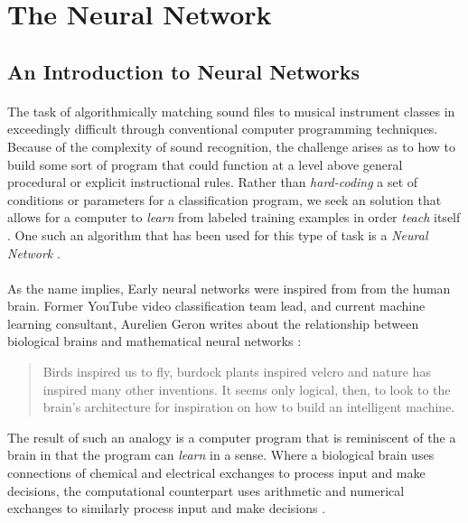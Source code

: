 \documentclass[12pt,letterpaper]{article}
\begin{document}

\newpage
\section{The Neural Network}
\label{sec-TheNeuralNetwork}


\subsection{An Introduction to Neural Networks}
\label{subsec-NerualNetworkIntro}

\paragraph*{}The task of algorithmically matching sound files to musical instrument classes in exceedingly difficult through conventional computer programming techniques. Because of the complexity of sound recognition, the challenge arises as to how to build some sort of program that could function at a level above general procedural or explicit instructional rules. Rather than \textit{hard-coding} a set of conditions or parameters for a classification program, we seek an solution that allows for a computer to \textit{learn} from labeled training examples in order \textit{teach} itself \cite{Bishop,Mitchell}. One such an algorithm that has been used for this type of task is a \textit{Neural Network} \cite{Geron2,Goodfellow,Levine}.

\paragraph*{}As the name implies, Early neural networks were inspired from from the human brain. Former YouTube video classification team lead, and current machine learning consultant, Aurelien Geron writes about the relationship between biological brains and mathematical neural networks \cite{Geron}: 
\begin{quote}
Birds inspired us to fly, burdock plants inspired velcro and nature has inspired many other inventions. It seems only logical, then, to look to the brain's architecture for inspiration on how to build an intelligent machine.
\end{quote}
The result of such an analogy is a computer program that is reminiscent of the a brain in that the program can \textit{learn} in a sense. Where a biological brain uses connections of chemical and electrical exchanges to process input and make decisions, the computational counterpart uses arithmetic and numerical exchanges to similarly process input and make decisions \cite{Geron,Levine,Bishop}. 
\end{document}
